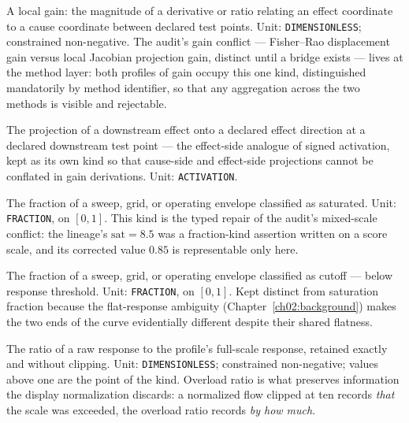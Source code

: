 \begin{definition}\label{ch03:qk:gain}
A local gain: the magnitude of a derivative or ratio relating an effect coordinate to a cause coordinate between declared test points. Unit: \texttt{DIMENSIONLESS}; constrained non-negative. The audit's gain conflict --- Fisher--Rao displacement gain versus local Jacobian projection gain, distinct until a bridge exists --- lives at the method layer: both profiles of gain occupy this one kind, distinguished mandatorily by method identifier, so that any aggregation across the two methods is visible and rejectable.
\end{definition}

\begin{definition}\label{ch03:qk:effectproj}
The projection of a downstream effect onto a declared effect direction at a declared downstream test point --- the effect-side analogue of signed activation, kept as its own kind so that cause-side and effect-side projections cannot be conflated in gain derivations. Unit: \texttt{ACTIVATION}.
\end{definition}

\begin{definition}\label{ch03:qk:satfrac}
The fraction of a sweep, grid, or operating envelope classified as saturated. Unit: \texttt{FRACTION}, on $[0,1]$. This kind is the typed repair of the audit's mixed-scale conflict: the lineage's $\mathrm{sat}=8.5$ was a fraction-kind assertion written on a score scale, and its corrected value $0.85$ is representable only here.
\end{definition}

\begin{definition}\label{ch03:qk:cutfrac}
The fraction of a sweep, grid, or operating envelope classified as cutoff --- below response threshold. Unit: \texttt{FRACTION}, on $[0,1]$. Kept distinct from saturation fraction because the flat-response ambiguity (Chapter~\ref{ch02:background}) makes the two ends of the curve evidentially different despite their shared flatness.
\end{definition}

\begin{definition}\label{ch03:qk:overload}
The ratio of a raw response to the profile's full-scale response, retained exactly and without clipping. Unit: \texttt{DIMENSIONLESS}; constrained non-negative; values above one are the point of the kind. Overload ratio is what preserves information the display normalization discards: a normalized flow clipped at ten records \emph{that} the scale was exceeded, the overload ratio records \emph{by how much}.
\end{definition}

